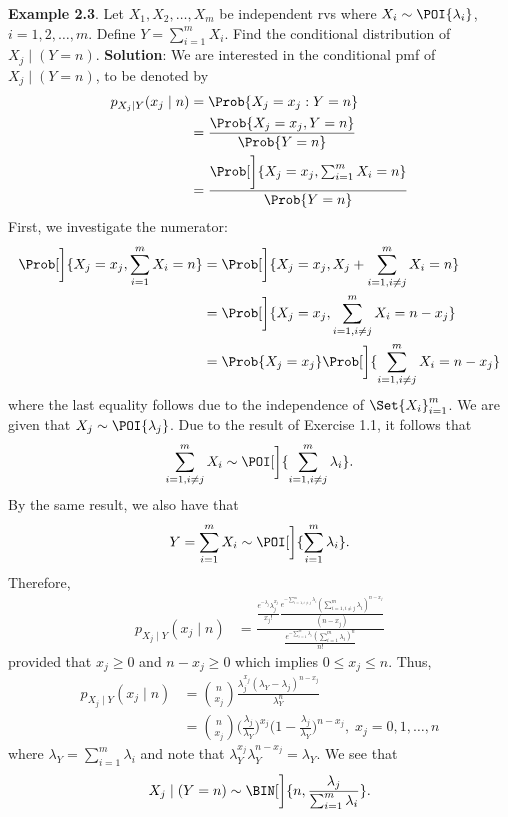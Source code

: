 \begin{Example}
    \textbf{Example 2.3}. Let $ X_1,X_2,\ldots,X_m $ be independent rvs where $ X_i \sim \POI{\lambda_i} $, $ i=1,2,\ldots,m $. Define
    $ Y=\sum_{i=1}^{m} X_i $. Find the conditional distribution of $ X_j\mid(Y=n) $.
    \tcblower{}
    \textbf{Solution}: We are interested in the conditional pmf of $ X_j\mid(Y=n) $, to be denoted by
    \begin{align*}
        p_{X_j\mid Y}(x_j\mid n)
         & =\Prob{X_j=x_j\given Y=n}                                      \\
         & =\frac{\Prob{X_j=x_j, Y=n}}{\Prob{Y=n}}                        \\
         & =\frac{\Prob[\bigg]{X_j=x_j,\sum_{i=1}^{m} X_i=n}}{\Prob{Y=n}}
    \end{align*}
    First, we investigate the numerator:
    \begin{align*}
        \Prob[\bigg]{X_j=x_j,\sum_{i=1}^{m} X_i=n}
         & =\Prob[\bigg]{X_j=x_j,X_j+\sum_{i=1,i\ne j}^m X_i=n}         \\
         & =\Prob[\bigg]{X_j=x_j,\sum_{i=1,i\ne j}^m X_i=n-x_j}         \\
         & =\Prob{X_j=x_j}\Prob[\bigg]{\sum_{i=1,i\ne j}^{m} X_i=n-x_j}
    \end{align*}
    where the last equality follows due to the independence of $ \Set{X_i}_{i=1}^m $. We are given that
    $ X_j \sim \POI{\lambda_j} $. Due to the result of Exercise 1.1, it follows that
    \[ \sum_{i=1,i\ne j}^{m} X_i \sim \POI[\bigg]{\sum_{i=1,i\ne j}^{m} \lambda_i}. \]
    By the same result, we also have that
    \[ Y=\sum_{i=1}^{m} X_i \sim \POI[\bigg]{\sum_{i=1}^{m} \lambda_i}. \]
    Therefore,
    \begin{align*}
        p_{X_j\mid Y}(x_j\mid n)
         & =\frac{\frac{e^{-\lambda_j}\lambda_j^{x_j}}{x_j!}\frac{e^{-\sum_{i=1,i\ne j}^{m} \lambda_i}(\sum_{i=1,i\ne j}^{m}\lambda_i)^{n-x_j}}{(n-x_j)}}{\frac{e^{-\sum_{i=1}^{m} \lambda_i}(\sum_{i=1}^{m} \lambda_i)^n}{n!}}
    \end{align*}
    provided that $ x_j\ge 0 $ and $ n-x_j\ge 0 $ which implies $ 0\le x_j\le n $. Thus,
    \begin{align*}
        p_{X_j\mid Y}(x_j\mid n)
         & =\binom{n}{x_j}\frac{\lambda_j^{x_j}(\lambda_Y-\lambda_j)^{n-x_j}}{\lambda_Y^n}                                                       \\
         & =\binom{n}{x_j}\biggl(\frac{\lambda_j}{\lambda_Y}\biggr)^{x_j}\biggl(1-\frac{\lambda_j}{\lambda_Y} \biggr)^{n-x_j},\;x_j=0,1,\ldots,n
    \end{align*}
    where $ \lambda_Y=\sum_{i=1}^{m} \lambda_i $ and note that $ \lambda_Y^{x_j}\lambda_Y^{n-x_j}=\lambda_Y $. We see that
    \[ X_j\mid (Y=n)\sim \BIN[\bigg]{n,\frac{\lambda_j}{\sum_{i=1}^{m} \lambda_i}}. \]
\end{Example}
